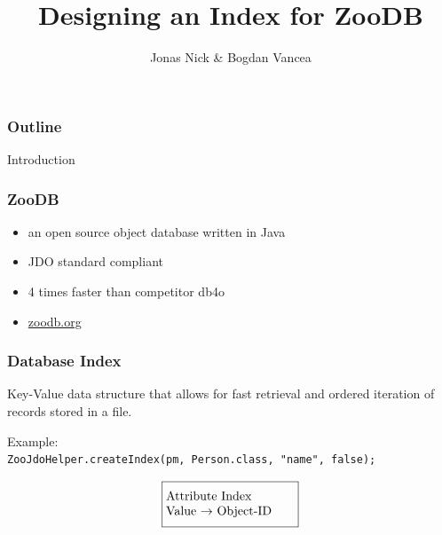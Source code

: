 \documentclass{beamer}
\title{Designing an Index for ZooDB}
\author{Jonas Nick \& Bogdan Vancea}
\begin{document}
  \frame{\titlepage}
  \begin{frame}
    \frametitle{Outline}
    \tableofcontents[hideallsubsections]
  \end{frame}

  \begin{section}{Introduction}
    \begin{frame}
      \frametitle{ZooDB}
      \begin{itemize}
        \item an open source object database written in Java
        \item JDO standard compliant
        \item 4 times faster than competitor db4o
        \item \url{zoodb.org}
      \end{itemize}

    \end{frame}
    \begin{frame}
      \frametitle{Database Index}
      \begin{block}{}
          Key-Value data structure that allows for fast retrieval and ordered iteration of records stored in a file.
      \end{block}
      \vspace{1em}
      \pause
      Example: \\
      \texttt{ZooJdoHelper.createIndex(pm, Person.class, "name", false);}
      \pause
      \begin{align*}
      \fbox{\parbox[t][3em][c]{0.29\textwidth}{Attribute Index\\ Value $\rightarrow$ Object-ID} }
      \end{align*}
      \pause
      \begin{center}
      \end{center}
    \end{frame}


\end{section}
\end{document}
